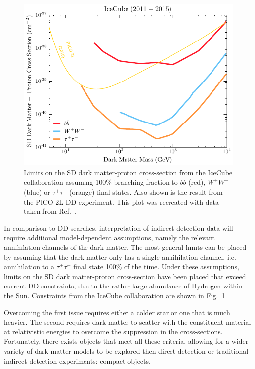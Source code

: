 \begin{figure}[!t]
    \centering
    \includegraphics{IceCube_2016.pdf}
    \caption{Limits on the SD dark matter-proton cross-section from the IceCube collaboration assuming 100\% branching fraction to $b\bar{b}$ (red), $W^+ W^-$ (blue) or $\tau^+ \tau^-$ (orange) final states. Also shown is the result from the PICO-2L DD experiment. This plot was recreated with data taken from Ref.~\cite{IceCube:2016dgk_mar_Searchannihilatingdark}.}
    \label{fig:IceCube_2016_SD}
\end{figure}

In comparison to DD searches, interpretation of indirect detection data will require additional model-dependent assumptions, namely the relevant annihilation channels of the dark matter. 
The most general limits can be placed by assuming that the dark matter only has a single annihilation channel, i.e. annihilation to a $\tau^+\tau^-$ final state 100\% of the time. 
Under these assumptions, limits on the SD dark matter-proton cross-section have been placed that exceed current DD constraints, due to the rather large abundance of Hydrogen within the Sun. Constraints from the IceCube collaboration are shown in Fig.~\ref{fig:IceCube_2016_SD}


Overcoming the first issue requires either a colder star or one that is much heavier. The second requires dark matter to scatter with the constituent material at relativistic energies to overcome the suppression in the cross-sections. 
Fortunately, there exists objects that meet all these criteria, allowing for a wider variety of dark matter models to be explored then direct detection or traditional indirect detection experiments: compact objects.

